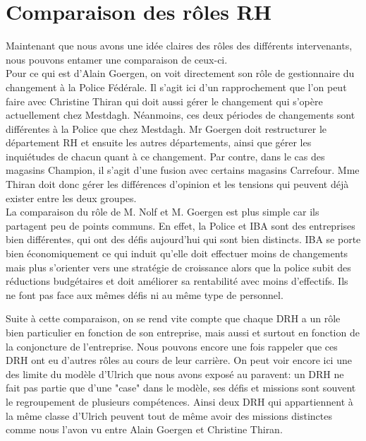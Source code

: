 \section{Comparaison des rôles RH}

Maintenant que nous avons une idée claires des rôles des différents intervenants, nous pouvons entamer une comparaison de ceux-ci. \\


Pour ce qui est d'Alain Goergen, on voit directement son rôle de gestionnaire du changement à la Police Fédérale. Il s'agit ici d'un rapprochement que l'on peut faire avec Christine Thiran qui doit aussi gérer le changement qui s'opère actuellement chez Mestdagh. Néanmoins, ces deux périodes de changements sont différentes à la Police que chez Mestdagh. Mr Goergen doit restructurer le département RH et ensuite les autres départements, ainsi que gérer les inquiétudes de chacun quant à ce changement. Par contre, dans le cas des magasins Champion, il s'agit d'une fusion avec certains magasins Carrefour. Mme Thiran doit donc gérer les différences d'opinion et les tensions qui peuvent déjà exister entre les deux groupes. \\

La comparaison du rôle de M. Nolf et M. Goergen est plus simple car ils partagent peu de points communs. En effet, la Police et IBA sont des entreprises bien différentes, qui ont des défis aujourd'hui qui sont bien distincts. IBA se porte bien économiquement ce qui induit qu'elle doit effectuer moins de changements mais plus s'orienter vers une stratégie de croissance alors que la police subit des réductions budgétaires et doit améliorer sa rentabilité avec moins d'effectifs. Ils ne font pas face aux mêmes défis ni au même type de personnel. 


Suite à cette comparaison, on se rend vite compte que chaque DRH a un rôle bien particulier en fonction de son entreprise, mais aussi et surtout en fonction de la conjoncture de l'entreprise. Nous pouvons encore une fois rappeler que ces DRH ont eu d'autres rôles au cours de leur carrière. 
On peut voir encore ici une des limite du modèle d'Ulrich que nous avons exposé au paravent: un DRH ne fait pas partie que d'une "case" dans le modèle, ses défis et missions sont souvent le regroupement de plusieurs compétences. Ainsi deux DRH qui appartiennent à la même classe d'Ulrich peuvent tout de même avoir des missions distinctes comme nous l'avon vu entre Alain Goergen et Christine Thiran.
